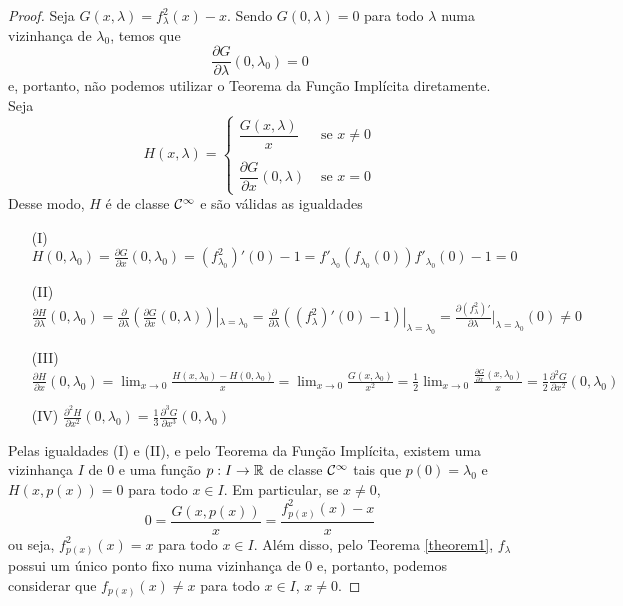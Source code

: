 \begin{proof}
Seja $G(x, \lambda) = f^2_\lambda (x) - x$. Sendo $G(0, \lambda) = 0$ para todo $\lambda$ numa vizinhança de $\lambda_0$, temos que
$$\frac{\partial G}{\partial \lambda}(0, \lambda_0) = 0$$
e, portanto, não podemos utilizar o Teorema da Função Implícita diretamente.
Seja
\[ H(x, \lambda) =
    \begin{cases} 
      \dfrac{G(x, \lambda)}{x} & \textrm{ se } x \neq 0 \\
      \\
      \dfrac{\partial G}{\partial x}(0, \lambda) & \textrm{ se } x = 0
   \end{cases}
\]
Desse modo, $H$ é de classe $\mathcal{C}^\infty$ e são válidas as igualdades
\begin{enumerate}
\item[(I)]
$H(0, \lambda_0) = \frac{\partial G}{\partial x}(0, \lambda_0) = (f^2_{\lambda_0})'(0) - 1 = f'_{\lambda_0}(f_{\lambda_0}(0)) f'_{\lambda_0}(0) - 1 = 0 $

\item[(II)]
$\frac{\partial H}{\partial \lambda}(0, \lambda_0) = \frac{\partial}{\partial \lambda} \left( \frac{\partial G}{\partial x}(0, \lambda) \right) |_{\lambda = \lambda_0} = \frac{\partial}{\partial \lambda}((f^2_\lambda)'(0) - 1)|_{\lambda = \lambda_0} = \frac{\partial (f^2_\lambda)'}{\partial \lambda}|_{\lambda = \lambda_0}(0) \neq 0$
 
\item[(III)]
$ \frac{\partial H}{\partial x}(0, \lambda_0) = \lim_{x \to 0} \frac{H(x, \lambda_0) - H(0, \lambda_0)}{x}
= \lim_{x \to 0} \frac{G(x, \lambda_0)}{x^2}
= \frac{1}{2} \lim_{x \to 0} \frac{\frac{\partial G}{\partial x}(x, \lambda_0)}{x} = \frac{1}{2}\frac{\partial^2 G}{\partial x^2}(0, \lambda_0) $
\item[(IV)]
$\frac{\partial^2 H}{\partial x^2}(0, \lambda_0) = \frac{1}{3} \frac{\partial^3 G}{\partial x^3}(0, \lambda_0)$
\end{enumerate}

Pelas igualdades (I) e (II), e pelo Teorema da Função Implícita, existem uma vizinhança $I$ de $0$ e uma função $p: I \to \mathbb{R}$ de classe $\mathcal{C}^\infty$ tais que $p(0) = \lambda_0$ e $H(x, p(x)) = 0$ para todo $x \in I$. Em particular, se $x \neq 0$,
$$0 = \frac{G(x, p(x))}{x} = \frac{f^2_{p(x)}(x) - x}{x}$$
ou seja, $f^2_{p(x)}(x) = x$ para todo $x \in I$. Além disso, pelo Teorema \ref{theorem1}, $f_\lambda$ possui um único ponto fixo numa vizinhança de $0$ e, portanto, podemos considerar que $f_{p(x)}(x) \neq x$ para todo $x \in I$, $x \neq 0$.


\end{proof}
